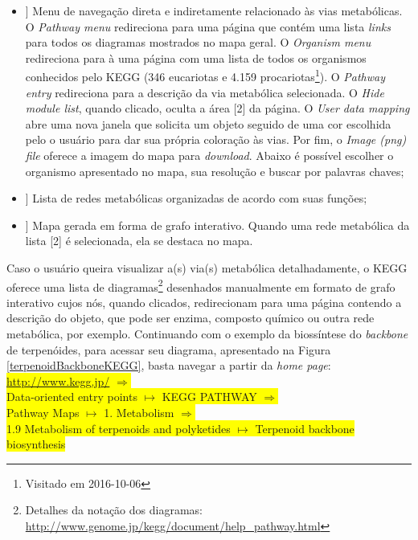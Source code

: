 \begin{itemize}
\item[[ 1]] Menu de navegação direta e indiretamente relacionado às vias metabólicas. O \textit{Pathway menu} redireciona para uma página que contém uma lista \textit{links} para todos os diagramas mostrados no mapa geral. O \textit{Organism menu} redireciona para à uma página com uma lista de todos os organismos conhecidos pelo KEGG (346 eucariotas e 4.159 procariotas\footnote{Visitado em 2016-10-06}). O \textit{Pathway entry} redireciona para a descrição da via metabólica selecionada. O \textit{Hide module list}, quando clicado, oculta a área [2] da página. O \textit{User data mapping} abre uma nova janela que solicita um objeto seguido de uma cor escolhida pelo o usuário para dar sua própria coloração às vias. Por fim, o \textit{Image (png) file} oferece a imagem do mapa para \textit{download}. Abaixo é possível escolher o organismo apresentado no mapa, sua resolução e buscar por palavras chaves;
\item[[ 2]] Lista de redes metabólicas organizadas de acordo com suas funções;
\item[[ 3]] Mapa gerada em forma de grafo interativo. Quando uma rede metabólica da lista [2] é selecionada, ela se destaca no mapa.
\end{itemize}

\indent Caso o usuário queira visualizar a(s) via(s) metabólica detalhadamente, o KEGG oferece uma lista de diagramas\footnote{Detalhes da notação dos diagramas: \url{http://www.genome.jp/kegg/document/help_pathway.html}} desenhados manualmente em formato de grafo interativo cujos nós, quando clicados, redirecionam para uma página contendo a descrição do objeto, que pode ser enzima, composto químico ou outra rede metabólica, por exemplo. Continuando com o exemplo da biossíntese do \textit{backbone} de terpenóides, para acessar seu diagrama, apresentado na Figura \ref{terpenoidBackboneKEGG}, basta navegar a partir da \textit{home page}: \\

\indent \colorbox{yellow}{\url{http://www.kegg.jp/} $\Rightarrow$} \\
\indent \colorbox{yellow}{Data-oriented entry points  $\mapsto$ KEGG PATHWAY $\Rightarrow$} \\
\indent \colorbox{yellow}{Pathway Maps $\mapsto$ 1. Metabolism  $\Rightarrow$} \\
\indent \colorbox{yellow}{1.9 Metabolism of terpenoids and polyketides  $\mapsto$ Terpenoid backbone biosynthesis} \\

